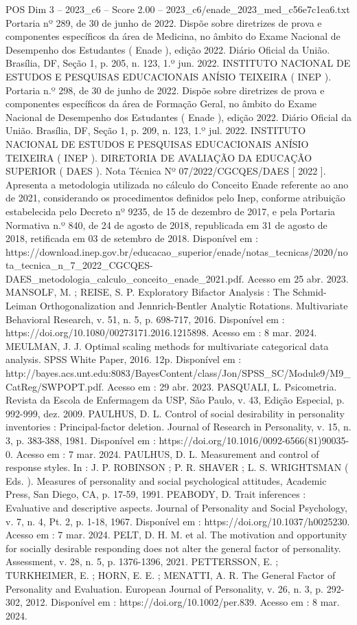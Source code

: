 \begin{textsample}{POS Dim 3 – 2023\_c6 – Score 2.00 – 2023\_c6/enade\_2023\_med\_c56e7c1ea6.txt}
Portaria nº 289, de 30 de junho de 2022.
Dispõe sobre diretrizes de prova e componentes específicos da área de Medicina, no âmbito do Exame Nacional de Desempenho dos Estudantes ( Enade ), edição 2022.
Diário Oficial da União.
Brasília, DF, Seção 1, p. 205, n. 123, 1.º jun. 2022.
INSTITUTO NACIONAL DE ESTUDOS E PESQUISAS EDUCACIONAIS ANÍSIO TEIXEIRA ( INEP ).
Portaria n.º 298, de 30 de junho de 2022.
Dispõe sobre diretrizes de prova e componentes específicos da área de Formação Geral, no âmbito do Exame Nacional de Desempenho dos Estudantes ( Enade ), edição 2022.
Diário Oficial da União.
Brasília, DF, Seção 1, p. 209, n. 123, 1.º jul. 2022.
INSTITUTO NACIONAL DE ESTUDOS E PESQUISAS EDUCACIONAIS ANÍSIO TEIXEIRA ( INEP ).
DIRETORIA DE AVALIAÇÃO DA EDUCAÇÃO SUPERIOR ( DAES ).
Nota Técnica Nº 07/2022/CGCQES/DAES [ 2022 ].
Apresenta a metodologia utilizada no cálculo do Conceito Enade referente ao ano de 2021, considerando os procedimentos definidos pelo Inep, conforme atribuição estabelecida pelo Decreto nº 9235, de 15 de dezembro de 2017, e pela Portaria Normativa n.º 840, de 24 de agosto de 2018, republicada em 31 de agosto de 2018, retificada em 03 de setembro de 2018.
Disponível em : https://download.inep.gov.br/educacao\_superior/enade/notas\_tecnicas/2020/nota\_tecnica\_n\_7\_2022\_CGCQES-DAES\_metodologia\_calculo\_conceito\_enade\_2021.pdf.
Acesso em 25 abr. 2023.
MANSOLF, M. ; REISE, S.
P.
Exploratory Bifactor Analysis : The Schmid-Leiman Orthogonalization and Jennrich-Bentler Analytic Rotations.
Multivariate Behavioral Research, v. 51, n. 5, p. 698-717, 2016.
Disponível em : https://doi.org/10.1080/00273171.2016.1215898.
Acesso em : 8 mar. 2024.
MEULMAN, J.
J.
Optimal scaling methods for multivariate categorical data analysis.
SPSS White Paper, 2016. 12p.
Disponível em : http://bayes.acs.unt.edu:8083/BayesContent/class/Jon/SPSS\_SC/Module9/M9\_CatReg/SWPOPT.pdf.
Acesso em : 29 abr. 2023.
PASQUALI, L.
Psicometria.
Revista da Escola de Enfermagem da USP, São Paulo, v. 43, Edição Especial, p. 992-999, dez. 2009.
PAULHUS, D.
L.
Control of social desirability in personality inventories : Principal-factor deletion.
Journal of Research in Personality, v. 15, n. 3, p. 383-388, 1981.
Disponível em : https://doi.org/10.1016/0092-6566(81)90035-0.
Acesso em : 7 mar. 2024.
PAULHUS, D.
L.
Measurement and control of response styles.
In : J.
P.
ROBINSON ; P.
R.
SHAVER ; L.
S.
WRIGHTSMAN ( Eds. ).
Measures of personality and social psychological attitudes, Academic Press, San Diego, CA, p. 17-59, 1991.
PEABODY, D.
Trait inferences : Evaluative and descriptive aspects.
Journal of Personality and Social Psychology, v. 7, n. 4, Pt. 2, p. 1-18, 1967.
Disponível em : https://doi.org/10.1037/h0025230.
Acesso em : 7 mar. 2024.
PELT, D.
H.
M. et al.
The motivation and opportunity for socially desirable responding does not alter the general factor of personality.
Assessment, v. 28, n. 5, p. 1376-1396, 2021.
PETTERSSON, E. ; TURKHEIMER, E. ; HORN, E.
E. ; MENATTI, A.
R.
The General Factor of Personality and Evaluation.
European Journal of Personality, v. 26, n. 3, p. 292-302, 2012.
Disponível em : https://doi.org/10.1002/per.839.
Acesso em : 8 mar. 2024.

\end{textsample}
